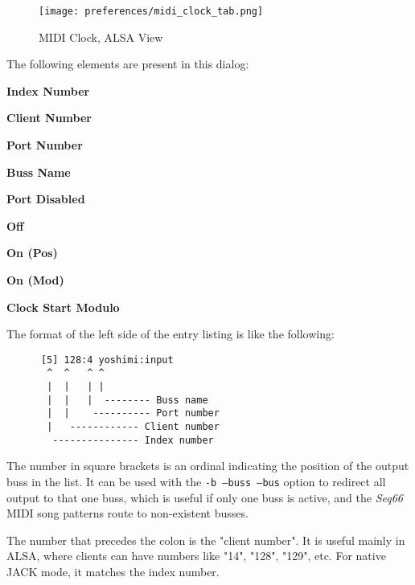 \begin{figure}[H]
   \centering 
   \texttt{[image: preferences/midi\_clock\_tab.png]}
   \caption{MIDI Clock, ALSA View}
   \label{fig:seq66_midi_clock_tab}
\end{figure}

   The following elements are present in this dialog:

   \begin{enumber}
      \item \textbf{Index Number}
      \item \textbf{Client Number}
      \item \textbf{Port Number}
      \item \textbf{Buss Name}
      \item \textbf{Port Disabled}
      \item \textbf{Off}
      \item \textbf{On (Pos)}
      \item \textbf{On (Mod)}
      \item \textbf{Clock Start Modulo}
   \end{enumber}

   The format of the left side of the entry listing is like the following:

   \begin{verbatim}
      [5] 128:4 yoshimi:input
       ^  ^   ^ ^
       |  |   | |
       |  |   |  -------- Buss name
       |  |    ---------- Port number
       |   ------------ Client number
        --------------- Index number
   \end{verbatim}

   \setcounter{ItemCounter}{0}      %

   The number in square brackets is an ordinal indicating the position
   of the output buss in the list.
   It can be used with the \texttt{-b --buss --bus} option to redirect all
   output to that one buss, which is useful if only one buss is active, and the
   \textsl{Seq66} MIDI song patterns route to non-existent busses.

   The number that precedes the colon is the "client number".
   It is useful mainly in ALSA, where clients can have numbers like "14",
   "128", "129", etc.  For native JACK mode, it matches the index number.

